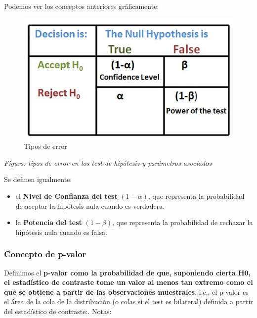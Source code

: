 \documentclass[11pt]{article}
\makeatletter
\def\maxwidth{\ifdim\Gin@nat@width>\linewidth\linewidth
    \else\Gin@nat@width\fi}
\let\Oldincludegraphics\includegraphics
\renewcommand{\includegraphics}[1]{\Oldincludegraphics[width=.8\maxwidth]{#1}}
\providecommand{\tightlist}{%
      \setlength{\itemsep}{0pt}\setlength{\parskip}{0pt}}
\makeatother
\begin{document}
Podemos ver los conceptos anteriores gráficamente:

\begin{figure}
\centering
\includegraphics{Hypothesis_Testing.jpg}
\caption{Tipos de error}
\end{figure}

\emph{Figura: tipos de error en los test de hipótesis y parámetros
asociados}

Se definen igualmente:

\begin{itemize}
\tightlist
\item
  el \textbf{Nivel de Confianza del test} \((1-\alpha)\), que representa
  la probabilidad de aceptar la hipótesis nula cuando es verdadera.
\item
  la \textbf{Potencia del test} \((1-\beta)\), que representa la
  probabilidad de rechazar la hipótesis nula cuando es falsa.
\end{itemize}

\subsubsection{Concepto de p-valor}\label{concepto-de-p-valor}

Definimos el \textbf{p-valor como la probabilidad de que, suponiendo
cierta H0, el estadístico de contraste tome un valor al menos tan
extremo como el que se obtiene a partir de las observaciones
muestrales}, i.e., el p-valor es el área de la cola de la distribución
(o colas si el test es bilateral) definida a partir del estadístico de
contraste:. Notas:
\end{document}
